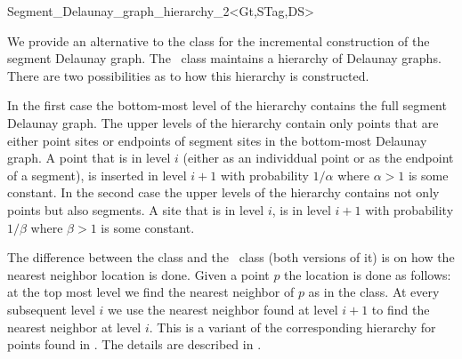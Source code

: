 


\begin{ccRefClass}{Segment_Delaunay_graph_hierarchy_2<Gt,STag,DS>}

\ccDefinition

We provide an alternative to the class
 for the incremental
construction of the segment Delaunay graph. The \ccRefName\ class
maintains a hierarchy of Delaunay graphs. There are two possibilities
as to how this hierarchy is constructed.

In the first case the bottom-most level of the hierarchy contains the
full segment Delaunay graph. The upper levels of the hierarchy
contain only points that are either point sites or endpoints of
segment sites in the bottom-most Delaunay graph. 
A point that is in level $i$ (either as an individdual point or as the
endpoint of a segment), is inserted in level $i+1$ with probability
$1/\alpha$ where $\alpha>1$ is some constant.
In the second case the upper levels of the hierarchy contains not only
points but also segments. A site that is in level $i$, is in level
$i+1$ with probability $1/\beta$ where $\beta > 1$ is some constant.

The difference between the 
class and the \ccRefName\ class (both versions of it) is on how the
nearest neighbor location is done. Given a point $p$ the location is
done as follows: at the top most level we find the nearest neighbor of
$p$ as in the  class. At
every subsequent level $i$ we use the nearest neighbor found at level
$i+1$ to find the nearest neighbor at level $i$. This is a variant of
the corresponding hierarchy for points found in \cite{cgal:d-dh-02}. The
details are described in \cite{cgal:k-reisv-04}.


\end{ccRefClass}
